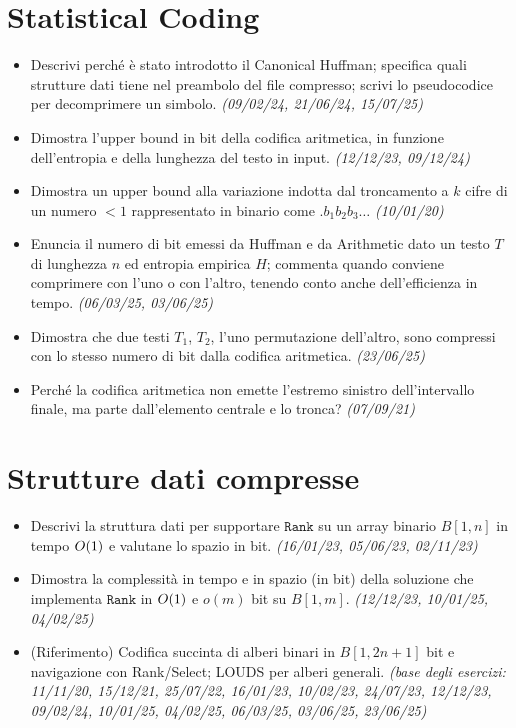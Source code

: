 \section{Statistical Coding}

\begin{itemize}[leftmargin=1.4em]
\item {}\hot Descrivi perch\'e \`e stato introdotto il Canonical Huffman; specifica quali
strutture dati tiene nel preambolo del file compresso; scrivi lo pseudocodice per decomprimere un
simbolo. \emph{(09/02/24, 21/06/24, 15/07/25)}
\item {} Dimostra l'upper bound in bit della codifica aritmetica, in funzione dell'entropia e
della lunghezza del testo in input. \emph{(12/12/23, 09/12/24)}
\item {} Dimostra un upper bound alla variazione indotta dal troncamento a $k$ cifre di un
numero $<1$ rappresentato in binario come $.b_1b_2b_3\ldots$ \emph{(10/01/20)}
\item {} Enuncia il numero di bit emessi da Huffman e da Arithmetic dato un testo $T$ di
lunghezza $n$ ed entropia empirica $H$; commenta quando conviene comprimere con l'uno o con l'altro,
tenendo conto anche dell'efficienza in tempo. \emph{(06/03/25, 03/06/25)}
\item {} Dimostra che due testi $T_1$, $T_2$, l'uno permutazione dell'altro, sono compressi
con lo stesso numero di bit dalla codifica aritmetica. \emph{(23/06/25)}
\item {} Perch\'e la codifica aritmetica non emette l'estremo sinistro dell'intervallo finale,
ma parte dall'elemento centrale e lo tronca? \emph{(07/09/21)}
\end{itemize}

\section{Strutture dati compresse}

\begin{itemize}[leftmargin=1.4em]
\item {}\hot Descrivi la struttura dati per supportare $\texttt{Rank}$ su un array binario
$B[1,n]$ in tempo $O\!\left(1\right)$ e valutane lo spazio in bit. \emph{(16/01/23, 05/06/23, 02/11/23)}
\item {}\hot Dimostra la complessit\`a in tempo e in spazio (in bit) della soluzione che
implementa $\texttt{Rank}$ in $O\!\left(1\right)$ e $o(m)$ bit su $B[1,m]$. \emph{(12/12/23, 10/01/25, 04/02/25)}
\item {} (Riferimento) Codifica succinta di alberi binari in $B[1,2n+1]$ bit e navigazione
con Rank/Select; LOUDS per alberi generali. \emph{(base degli esercizi: 11/11/20, 15/12/21,
25/07/22, 16/01/23, 10/02/23, 24/07/23, 12/12/23, 09/02/24, 10/01/25, 04/02/25, 06/03/25, 03/06/25, 23/06/25)}
\end{itemize}

